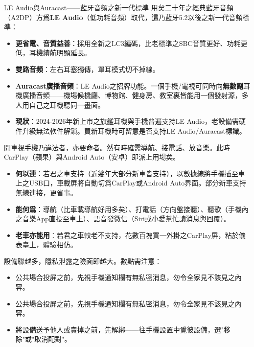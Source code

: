 \begin{tcbinfo}{LE Audio與Auracast——藍牙音頻之新一代標準}
用矣二十年之經典藍牙音頻（A2DP）方爲\textbf{LE Audio}（低功耗音頻）取代，這乃藍牙5.2以後之新一代音頻標準：

\begin{itemize}
  \item \textbf{更省電、音質益善}：採用全新之LC3編碼，比老標準之SBC音質更好、功耗更低，耳機續航明顯延長。
  \item \textbf{雙路音頻}：左右耳塞獨傳，單耳模式切不掉線。
  \item \textbf{Auracast廣播音頻}：LE Audio之招牌功能。一個手機/電視可同時向\textbf{無數副}耳機廣播音頻——機場候機廳、博物館、健身房、教室裏皆能用一個發射源，多人用自己之耳機聽同一畫面。
  \item \textbf{現狀}：2024-2026年新上市之旗艦耳機與手機普遍支持LE Audio，老設備需硬件升級無法軟件解鎖。買新耳機時可留意是否支持LE Audio/Auracast標識。
\end{itemize}

\end{tcbinfo}


開車視手機乃違法者，亦要命者。然有時確需導航、接電話、放音樂。此時CarPlay（蘋果）與Android Auto（安卓）即派上用場矣。

\begin{itemize}
  \item \textbf{何以連}：若君之車支持（近幾年大部分新車皆支持），以數據線將手機插至車上之USB口，車載屏將自動切爲CarPlay或Android Auto界面。部分新車支持無線連接，更省事。
  \item \textbf{能何爲}：導航（比車載導航好用多矣）、打電話（方向盤接聽）、聽歌（手機內之音樂App直投至車上）、語音發微信（Siri或小愛幫忙讀消息與回覆）。
  \item \textbf{老車亦能用}：若君之車較老不支持，花數百塊買一外掛之CarPlay屏，粘於儀表臺上，體驗相仿。
\end{itemize}


設備聯越多，隱私泄露之險面即越大。數點需注意：

\begin{itemize}
  \item 公共場合投屏之前，先視手機通知欄有無私密消息，勿令全家見不該見之內容。
  \item 公共場合投屏之前，先視手機通知欄有無私密消息，勿令全家見不該見之內容。
  \item 將設備送予他人或賣掉之前，先解綁——往手機設置中覓彼設備，選"移除"或"取消配對"。
\end{itemize}

